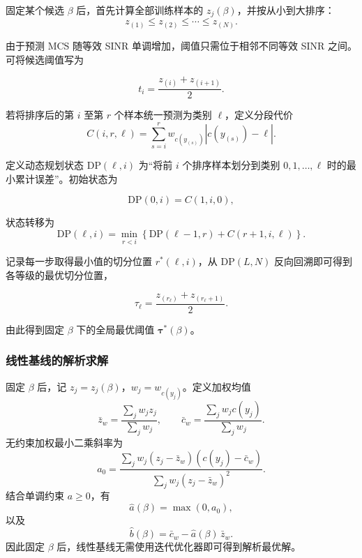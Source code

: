\documentclass[bwprint]{gmcmthesis}
\numberwithin{figure}{section}
\begin{document}
固定某个候选 $\beta$ 后，首先计算全部训练样本的 $z_j(\beta)$，并按从小到大排序：
\begin{equation}
	z_{(1)}\le z_{(2)}\le\cdots\le z_{(N)}.
\end{equation}

由于预测 MCS 随等效 SINR 单调增加，阈值只需位于相邻不同等效 SINR 之间。可将候选阈值写为

\begin{equation}
	t_i=\frac{z_{(i)}+z_{(i+1)}}{2}.
\end{equation}

若将排序后的第 $i$ 至第 $r$ 个样本统一预测为类别 $\ell$，定义分段代价
\begin{equation}
	\boxed{
	C(i,r,\ell)
	=
	\sum_{s=i}^{r}
	w_{c(y_{(s)})}
	\left|c(y_{(s)})-\ell\right|.
	}
	\label{eq:seg-cost}
\end{equation}

定义动态规划状态 $\mathrm{DP}(\ell,i)$ 为``将前 $i$ 个排序样本划分到类别 $0,1,\ldots,\ell$ 时的最小累计误差''。初始状态为

\begin{equation}
	\mathrm{DP}(0,i)=C(1,i,0),
\end{equation}

状态转移为
\begin{equation}
	\boxed{
	\mathrm{DP}(\ell,i)
	=
	\min_{r<i}
	\left\{
	\mathrm{DP}(\ell-1,r)+C(r+1,i,\ell)
	\right\}.
	}
	\label{eq:dp}
\end{equation}

记录每一步取得最小值的切分位置 $r^*(\ell,i)$，从 $\mathrm{DP}(L,N)$ 反向回溯即可得到各等级的最优切分位置，

\begin{equation}
	\boxed{
	\tau_\ell=\frac{z_{(r_\ell)}+z_{(r_\ell+1)}}{2}.
	}
	\label{eq:tau-recover}
\end{equation}

由此得到固定 $\beta$ 下的全局最优阈值 $\boldsymbol{\tau}^*(\beta)$。

\subsubsection{线性基线的解析求解}

固定 $\beta$ 后，记 $z_j=z_j(\beta)$，$w_j=w_{c(y_j)}$。定义加权均值
\begin{equation}
	\bar z_w=\frac{\sum_j w_j z_j}{\sum_j w_j},
	\qquad
	\bar c_w=\frac{\sum_j w_j c(y_j)}{\sum_j w_j}.
\end{equation}
无约束加权最小二乘斜率为
\begin{equation}
	a_0=\frac{\sum_j w_j(z_j-\bar z_w)\left(c(y_j)-\bar c_w\right)}{\sum_j w_j(z_j-\bar z_w)^2}.
\end{equation}
结合单调约束 $a\ge0$，有
\begin{equation}
	\boxed{\widehat a(\beta)=\max(0,a_0),}
	\label{eq:a-hat}
\end{equation}
以及
\begin{equation}
	\boxed{\widehat b(\beta)=\bar c_w-\widehat a(\beta)\,\bar z_w.}
	\label{eq:b-hat}
\end{equation}
因此固定 $\beta$ 后，线性基线无需使用迭代优化器即可得到解析最优解。
\end{document}
